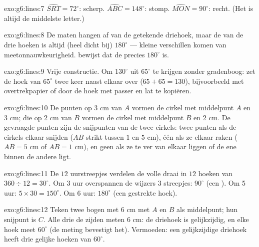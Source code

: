 \begin{solution}{exo:g6:lines:7}
$\widehat{SRT} = 72^\circ$: scherp. \quad
$\widehat{ABC} = 148^\circ$: stomp. \quad
$\widehat{MON} = 90^\circ$: recht. (Het  is altijd de middelste
letter.)
\end{solution}

\begin{solution}{exo:g6:lines:8}
De maten hangen af van de getekende driehoek, maar de  van de drie hoeken is
altijd (heel dicht bij) $180^\circ$ --- kleine verschillen komen van
meetonnauwkeurigheid.  bewijst dat de  precies
$180^\circ$ is.
\end{solution}

\begin{solution}{exo:g6:lines:9}
Vrije constructie. Om $130^\circ$ uit $65^\circ$ te krijgen zonder gradenboog:
zet de hoek van $65^\circ$ twee keer naast elkaar over ($65 + 65 = 130$),
bijvoorbeeld met overtrekpapier of door de hoek met passer en lat te kopiëren.
\end{solution}

\begin{solution}{exo:g6:lines:10}
De punten op $3$ cm van $A$ vormen de cirkel met middelpunt $A$ en  $3$
cm; die op $2$ cm van $B$ vormen de cirkel met middelpunt $B$ en  $2$ cm.
De gevraagde punten zijn de snijpunten van de twee cirkels: twee punten als de
cirkels elkaar snijden ($AB$ strikt tussen $1$ en $5$ cm), één als ze elkaar
raken ($AB = 5$ cm of $AB = 1$ cm), en geen als ze te ver van elkaar liggen of
de ene binnen de andere ligt.
\end{solution}

\begin{solution}{exo:g6:lines:11}
De $12$ uurstreepjes verdelen de volle draai in $12$ hoeken van
$360 \div 12 = 30^\circ$. Om 3 uur overspannen de wijzers $3$ streepjes:
$90^\circ$ (een ). Om 5 uur: $5 \times 30 = 150^\circ$. Om 6 uur:
$180^\circ$ (een gestrekte hoek).
\end{solution}

\begin{solution}{exo:g6:lines:12}
Teken twee bogen met  $6$ cm met $A$ en $B$ als middelpunt; hun snijpunt
is $C$. Alle drie de zijden meten $6$ cm: de driehoek is gelijkzijdig, en elke
hoek meet $60^\circ$ (de meting bevestigt het). Vermoeden: een gelijkzijdige
driehoek heeft drie gelijke hoeken van $60^\circ$.
\end{solution}

